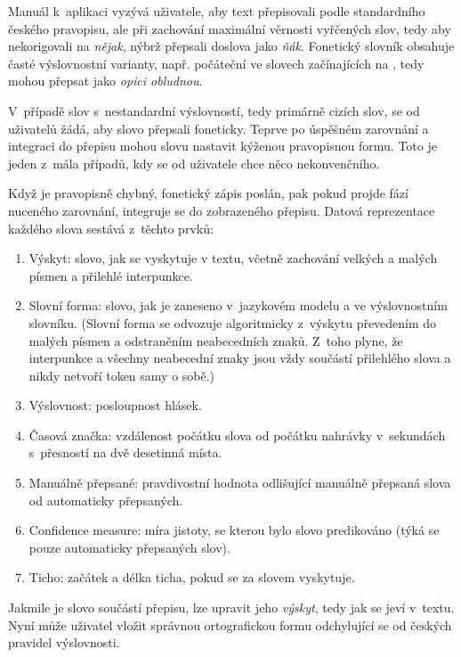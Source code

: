 Manuál k~aplikaci vyzývá uživatele, aby text přepisovali podle standardního
českého pravopisu, ale při zachování maximální věrnosti vyřčených slov, tedy aby
nekorigovali
na {\em nějak}, nýbrž
přepsali doslova jako {\em ňák}. Fonetický slovník obsahuje časté výslovnostní
varianty, např. počáteční
{}
ve slovech
začínajících na
,
tedy
{}
mohou přepsat jako {\em opici obludnou}.

V~případě slov s~nestandardní výslovností, tedy primárně cizích slov, se od
uživatelů žádá, aby slovo přepsali foneticky. Teprve po úspěšném zarovnání a
integraci do přepisu mohou slovu nastavit kýženou pravopisnou formu. Toto je
jeden z~mála případů, kdy se od uživatele chce něco nekonvenčního.

Když je pravopisně chybný, fonetický zápis poslán, pak pokud projde fází
nuceného zarovnání, integruje se do zobrazeného přepisu. Datová reprezentace
každého slova sestává z~těchto prvků:
\begin{enumerate}
\item{Výskyt:
    slovo, jak se vyskytuje v textu, včetně zachování velkých a malých písmen a
    přilehlé interpunkce.
}
\item{Slovní forma:
    slovo, jak je zaneseno v~jazykovém modelu a ve výslovnostním slovníku.
    (Slovní forma se odvozuje algoritmicky z~výskytu převedením do malých písmen
    a odstraněním neabecedních znaků. Z~toho plyne, že interpunkce a všechny
    neabecední znaky jsou vždy součástí přilehlého slova a nikdy netvoří token
    samy o sobě.)
}
\item{Výslovnost:
    posloupnost hlásek.
}
\item{Časová značka:
    vzdálenost počátku slova od počátku nahrávky v~sekundách s~přesností na dvě
    desetinná místa.
}
\item{Manuálně přepsané:
    pravdivostní hodnota odlišující manuálně přepsaná slova od automaticky
    přepsaných.
}
\item{Confidence measure:
    míra jistoty, se kterou bylo slovo predikováno (týká se pouze automaticky
    přepsaných slov).
}
\item{Ticho:
    začátek a délka ticha, pokud se za slovem vyskytuje.
}
\end{enumerate}
Jakmile je slovo součástí přepisu, lze upravit jeho {\em výskyt}, tedy jak se
jeví v~textu. Nyní může uživatel vložit správnou ortografickou formu odchylující
se od českých pravidel výslovnosti.

